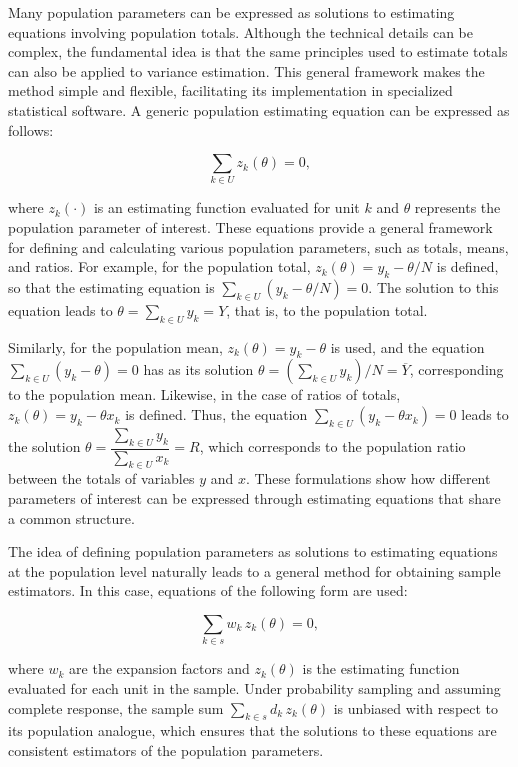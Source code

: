 \documentclass[
  english,
  12pt,
]{book}
\begin{document}
Many population parameters can be expressed as solutions to estimating equations involving population totals. Although the technical details can be complex, the fundamental idea is that the same principles used to estimate totals can also be applied to variance estimation. This general framework makes the method simple and flexible, facilitating its implementation in specialized statistical software. A generic population estimating equation can be expressed as follows:

\[
\sum_{k\in U} z_k(\theta)=0,
\]

where \(z_k(\cdot)\) is an estimating function evaluated for unit \(k\) and \(\theta\) represents the population parameter of interest. These equations provide a general framework for defining and calculating various population parameters, such as totals, means, and ratios. For example, for the population total, \(z_k(\theta)=y_k-\theta/N\) is defined, so that the estimating equation is \(\sum_{k\in U}(y_k-\theta/N)=0\). The solution to this equation leads to \(\theta=\sum_{k\in U} y_k = Y\), that is, to the population total.

Similarly, for the population mean, \(z_k(\theta)=y_k-\theta\) is used, and the equation \(\sum_{k\in U}(y_k-\theta)=0\) has as its solution \(\theta=\left(\sum_{k\in U} y_k\right)/N = \overline{Y}\), corresponding to the population mean. Likewise, in the case of ratios of totals, \(z_k(\theta)=y_k-\theta x_k\) is defined. Thus, the equation \(\sum_{k\in U}(y_k-\theta x_k)=0\) leads to the solution \(\theta=\dfrac{\sum_{k\in U} y_k}{\sum_{k\in U} x_k} = R\), which corresponds to the population ratio between the totals of variables \(y\) and \(x\). These formulations show how different parameters of interest can be expressed through estimating equations that share a common structure.

The idea of defining population parameters as solutions to estimating equations at the population level naturally leads to a general method for obtaining sample estimators. In this case, equations of the following form are used:

\[
\sum_{k\in s} w_k\, z_k(\theta)=0,
\]

where \(w_k\) are the expansion factors and \(z_k(\theta)\) is the estimating function evaluated for each unit in the sample. Under probability sampling and assuming complete response, the sample sum \(\sum_{k\in s} d_k\, z_k(\theta)\) is unbiased with respect to its population analogue, which ensures that the solutions to these equations are consistent estimators of the population parameters.
\end{document}
